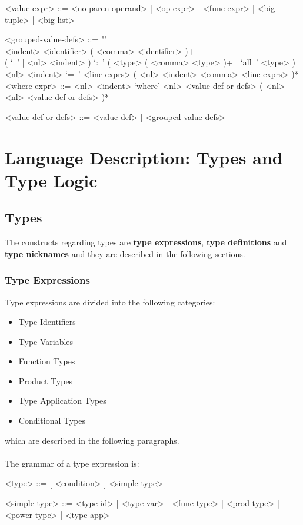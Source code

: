 \documentclass{article}
\begin{document}
\begin{grammar}
<value-expr> ::=
<no-paren-operand> | <op-expr> | <func-expr> | <big-tuple> | <big-list>

<grouped-value-defs> ::= ""\\
<indent> <identifier> ( <comma> <identifier> )+ \\
( `\ ' | <nl> <indent> ) `:\ ' ( <type> ( <comma> <type> )+ | `all\ ' <type> ) \\
<nl> <indent> `=\ ' <line-exprs> ( <nl> <indent> <comma> <line-exprs> )*
\\

<where-expr> ::=
<nl> <indent> `where' <nl> <value-def-or-defs> ( <nl> <nl> <value-def-or-defs> )*

<value-def-or-defs> ::= <value-def> | <grouped-value-defs> 
\end{grammar}

\section{Language Description: Types and Type Logic}

\subsection{Types}
\label{subsec:types}

The constructs regarding types are \textbf{type expressions}, \textbf{type
definitions} and \textbf{type nicknames} and they are described in the
following sections.

\subsubsection{Type Expressions}

Type expressions are divided into the following categories:
\begin{itemize}
\item Type Identifiers
\item Type Variables
\item Function Types
\item Product Types
\item Type Application Types
\item Conditional Types
\end{itemize}
which are described in the following paragraphs.
\\\\
The grammar of a type expression is:
\begin{grammar}
<type> ::= [ <condition> ]  <simple-type> 

<simple-type> ::=
<type-id> | <type-var> | <func-type> | <prod-type> | <power-type> | <type-app>
\\
\end{grammar}
\end{document}
